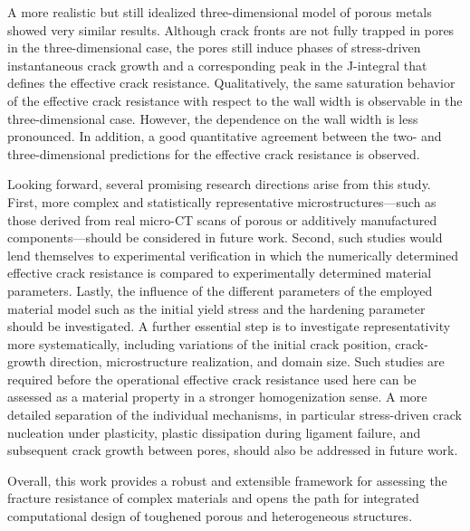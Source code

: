 \documentclass[pdflatex,sn-mathphys-num]{sn-jnl}%
\theoremstyle{thmstyleone}%
\theoremstyle{thmstyletwo}%
\theoremstyle{thmstylethree}%
\begin{document}
A more realistic but still idealized three-dimensional model of porous metals showed very similar
results. Although crack fronts are not fully trapped in pores in the three-dimensional case, the pores still induce
phases of stress-driven instantaneous crack growth and a corresponding peak in the J-integral that
defines the effective crack resistance. Qualitatively, the same saturation behavior of the
effective crack resistance with respect to the wall width is observable in the three-dimensional case. However,
the dependence on the wall width is less pronounced. In addition, a good quantitative agreement
between the two- and three-dimensional predictions for the effective crack resistance is observed.

Looking forward, several promising research directions arise from this study. 
First, more complex
and statistically representative microstructures—such 
as those derived from real micro-CT scans of
porous or additively manufactured components—should 
be considered in future work. Second, such studies would lend themselves to experimental
verification in which the numerically determined effective crack resistance is compared to 
experimentally determined material parameters. Lastly, the influence of the 
different parameters of the employed material model such as the initial yield stress and the hardening
parameter should be investigated.
A further essential step is to investigate representativity more systematically, including variations of the initial crack position, crack-growth direction, microstructure realization, and domain size. Such studies are required before the operational effective crack resistance used here can be assessed as a material property in a stronger homogenization sense.
A more detailed separation of the individual mechanisms, in particular stress-driven crack nucleation under plasticity, plastic dissipation during ligament failure, and subsequent crack growth between pores, should also be addressed in future work.

Overall, this work provides a robust and extensible framework for assessing the fracture resistance
of complex materials and opens the path for integrated computational design of toughened porous and
heterogeneous structures.


\end{document}
